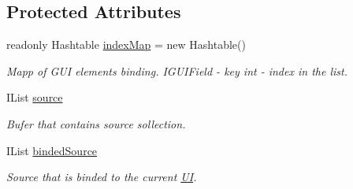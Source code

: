 \subsection*{Protected Attributes}
\begin{DoxyCompactItemize}
\item 
readonly Hashtable \mbox{\hyperlink{class_wpf_handler_1_1_u_i_1_1_controls_1_1_collection_control_af3a8d4c03474bbb80d8d461f4a8e33e8}{index\+Map}} = new Hashtable()
\begin{DoxyCompactList}\small\item\em Mapp of G\+UI elements binding. I\+G\+U\+I\+Field -\/ key int -\/ index in the list. \end{DoxyCompactList}\item 
I\+List \mbox{\hyperlink{class_wpf_handler_1_1_u_i_1_1_controls_1_1_collection_control_a78ccfdc5208ab2306308d7356757f32f}{source}}
\begin{DoxyCompactList}\small\item\em Bufer that contains source sollection. \end{DoxyCompactList}\item 
I\+List \mbox{\hyperlink{class_wpf_handler_1_1_u_i_1_1_controls_1_1_collection_control_a128726ac8376cf78e3c33ba1c9f00b2d}{binded\+Source}}
\begin{DoxyCompactList}\small\item\em Source that is binded to the current \mbox{\hyperlink{namespace_wpf_handler_1_1_u_i}{UI}}. \end{DoxyCompactList}\end{DoxyCompactItemize}
